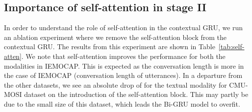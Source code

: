 \documentclass[lettersize,journal]{IEEEtran}
\begin{document}
\subsection{Importance of self-attention in stage II}
In order to understand the role of self-attention  in the contextual GRU, we run an ablation experiment where we remove the self-attention block from the contextual GRU. The results from this experiment are shown in Table~\ref{tab:self-atten}. We note that self-attention improves the performance for both the modalities  in IEMOCAP. This is expected as the conversation length is more in the case of IEMOCAP (conversation length of  utterances). In a departure from the other datasets, we see an absolute drop of  for the textual modality for CMU-MOSI dataset on the introduction of the self-attention block. This may partly be due to the small size of this dataset, which leads the Bi-GRU model to overfit.
\end{document}
